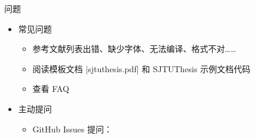 \begin{frame}[fragile]{\SJTUThesis 问题}
  \begin{itemize}
    \item 常见问题
          \begin{itemize}
            \item 参考文献列表出错、缺少字体、无法编译、格式不对……
            \item 阅读模板文档 |sjtuthesis.pdf| 和 SJTUThesis 示例文档代码
            \item 查看 FAQ 
          \end{itemize}
    \item 主动提问
          \begin{itemize}
            \item GitHub Issues 提问：
          \end{itemize}
  \end{itemize}
\end{frame}
